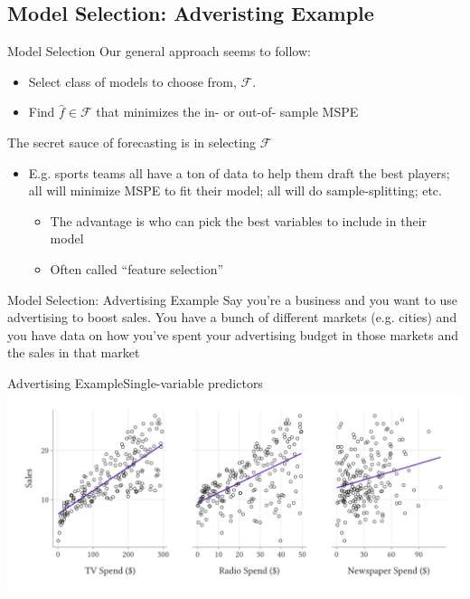 \documentclass[aspectratio=169,t,11pt,table]{beamer}
\begin{document}
\subsection{Model Selection: Adveristing Example}

\begin{frame}{Model Selection}
  Our general approach seems to follow:
  \begin{itemize}
    \item Select class of models to choose from, $\mathcal{F}$.
    
    \item Find $\hat{f} \in \mathcal{F}$ that minimizes the in- or out-of- sample MSPE
  \end{itemize}
  
  \bigskip
  The secret sauce of forecasting is in selecting $\mathcal{F}$
  \begin{itemize}
    \item E.g. sports teams all have a ton of data to help them draft the best players; all will minimize MSPE to fit their model; all will do sample-splitting; etc. 
    \begin{itemize}
      \item The advantage is who can pick the best \alert{variables} to include in their model
      \item Often called ``\alert{feature selection}''
    \end{itemize}
  \end{itemize} 
\end{frame}

\begin{frame}{Model Selection: Advertising Example}
  Say you're a business and you want to use advertising to boost sales. You have a bunch of different markets (e.g. cities) and you have data on how you've spent your advertising budget in those markets and the sales in that market
\end{frame}

\begin{frame}{Advertising Example}{Single-variable predictors}
  \includegraphics[width=\textwidth]{figures/sales_bivariate.pdf}
\end{frame}
\end{document}
